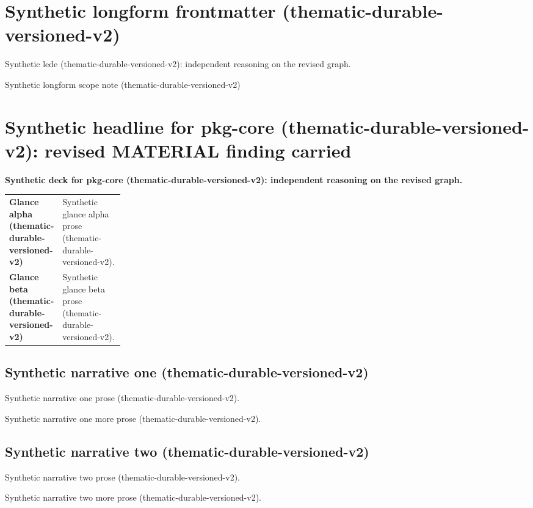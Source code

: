 \documentclass[lualatex,a4paper,10pt]{jlreq}
\begin{document}
\surveycover
\clearpage
\section*{Synthetic longform frontmatter (thematic-durable-versioned-v2)}
Synthetic lede (thematic-durable-versioned-v2): independent reasoning on the revised graph.

\begin{claimboundary}
\noindent Synthetic longform scope note (thematic-durable-versioned-v2)\par
\end{claimboundary}
\medskip
\tableofcontents
\clearpage
\Needspace{0.24\textheight}
\section{Synthetic headline for pkg-core (thematic-durable-versioned-v2): revised MATERIAL finding carried}
\label{pkg:pkg-core}
\noindent\textbf{Synthetic deck for pkg-core (thematic-durable-versioned-v2): independent reasoning on the revised graph.} \cite{sp001lnd001}\par\medskip
\begin{themeoverview}
\begin{tabularx}{\linewidth}{@{}>{\bfseries}p{0.22\linewidth}X@{}}
Glance alpha (thematic-durable-versioned-v2) & Synthetic glance alpha prose (thematic-durable-versioned-v2). \cite{sp001lnd001} \\
Glance beta (thematic-durable-versioned-v2) & Synthetic glance beta prose (thematic-durable-versioned-v2). \cite{sp001lnd001} \\
\end{tabularx}
\end{themeoverview}
\medskip
\begin{multicols}{2}
\subsection*{Synthetic narrative one (thematic-durable-versioned-v2)}
\noindent Synthetic narrative one prose (thematic-durable-versioned-v2). \cite{sp001lnd001}\par\medskip
\noindent Synthetic narrative one more prose (thematic-durable-versioned-v2). \cite{sp001lnd001}\par\medskip
\subsection*{Synthetic narrative two (thematic-durable-versioned-v2)}
\noindent Synthetic narrative two prose (thematic-durable-versioned-v2). \cite{sp001lnd001}\par\medskip
\noindent Synthetic narrative two more prose (thematic-durable-versioned-v2). \cite{sp001lnd001}\par\medskip
\end{multicols}
\end{document}

